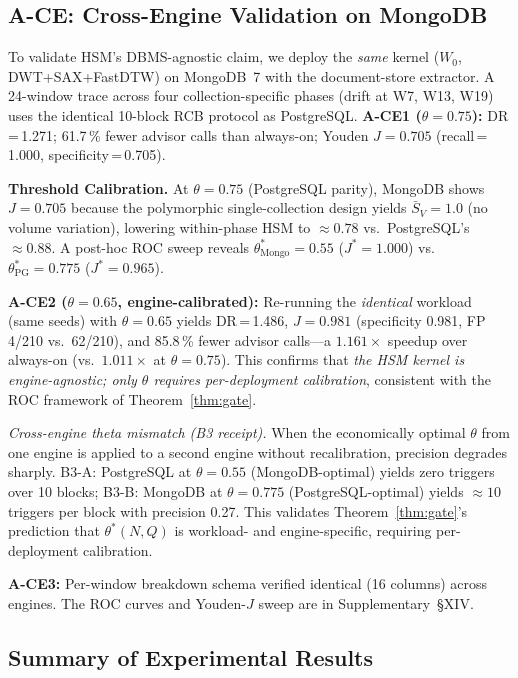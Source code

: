 \documentclass[10pt,journal,compsoc]{IEEEtran}
\newcommand{\thetastar}{\theta^{*}}
\begin{document}
\FloatBarrier
\subsection{A-CE: Cross-Engine Validation on MongoDB}\label{sec:mongo-exp}

To validate HSM's DBMS-agnostic claim, we deploy the \emph{same} kernel
($W_0$, DWT+SAX+FastDTW) on MongoDB~7 with the document-store extractor.
A 24-window trace across four collection-specific phases (drift at W7, W13, W19)
uses the identical 10-block RCB protocol as PostgreSQL.
\textbf{A-CE1 ($\theta\!=\!0.75$):} DR\,=\,1.271; 61.7\,\% fewer advisor calls than always-on;
Youden $J\!=\!0.705$ (recall\,=\,1.000, specificity\,=\,0.705).

\textbf{Threshold Calibration.}
At $\theta\!=\!0.75$ (PostgreSQL parity), MongoDB shows $J\!=\!0.705$
because the polymorphic single-collection design yields $\bar{S}_V\!=\!1.0$
(no volume variation), lowering within-phase HSM to $\approx\!0.78$ vs.\
PostgreSQL's $\approx\!0.88$.
A post-hoc ROC sweep reveals
$\thetastar_{\mathrm{Mongo}}\!=\!0.55$ ($J^*\!=\!1.000$) vs.\
$\thetastar_{\mathrm{PG}}\!=\!0.775$ ($J^*\!=\!0.965$).

\textbf{A-CE2 ($\theta\!=\!0.65$, engine-calibrated):} Re-running the
\emph{identical} workload (same seeds) with $\theta\!=\!0.65$ yields
DR\,=\,1.486, $J\!=\!0.981$ (specificity 0.981, FP 4/210 vs.\ 62/210),
and 85.8\,\% fewer advisor calls---a $1.161\times$ speedup over always-on
(vs.\ $1.011\times$ at $\theta\!=\!0.75$).
This confirms that \emph{the HSM kernel is engine-agnostic; only $\theta$
requires per-deployment calibration}, consistent with the ROC framework
of Theorem~\ref{thm:gate}.

\emph{Cross-engine theta mismatch (B3 receipt).}
When the economically optimal $\theta$ from one engine is applied to a second engine without recalibration, precision degrades sharply.
B3-A: PostgreSQL at $\theta\!=\!0.55$ (MongoDB-optimal) yields zero triggers over 10 blocks;
B3-B: MongoDB at $\theta\!=\!0.775$ (PostgreSQL-optimal) yields $\approx\!10$ triggers per block with precision 0.27.
This validates Theorem~\ref{thm:gate}'s prediction that $\thetastar(N,Q)$ is workload- and engine-specific, requiring per-deployment calibration.

\textbf{A-CE3:} Per-window breakdown schema verified identical (16 columns) across engines.
The ROC curves and Youden-$J$ sweep are in Supplementary~\S XIV.

\FloatBarrier
\subsection{Summary of Experimental Results}
\end{document}
